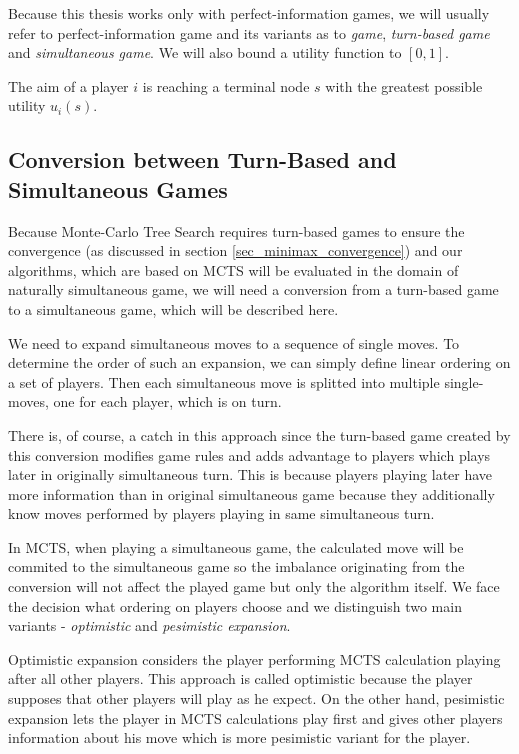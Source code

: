 Because this thesis works only with perfect-information games, we will usually refer to
perfect-information game and its variants as to \emph{game}, \emph{turn-based game} and
\emph{simultaneous game}. We will also bound a utility function to $[0,1]$.

The aim of a player $i$ is reaching a terminal node $s$ with the greatest possible utility
$u_i(s)$.

\subsection{Conversion between Turn-Based and Simultaneous Games}
\label{sec_turn_based_game_conversion}

Because Monte-Carlo Tree Search requires turn-based games to ensure the convergence (as discussed in
section \ref{sec_minimax_convergence}) and our
algorithms, which are based on MCTS will be evaluated in the domain of naturally simultaneous game,
we will need a conversion from a turn-based game to a simultaneous game, which will be described
here.

We need to expand simultaneous moves to a sequence of single moves. To determine the order of such
an expansion, we can simply define linear ordering on a set of players. Then each simultaneous move
is splitted into multiple single-moves, one for each player, which is on turn.

There is, of course, a catch in this approach since the turn-based game created by this conversion
modifies game rules and adds advantage to players which plays later in originally simultaneous turn.
This is because players playing later have more information than in original simultaneous game
because they additionally know moves performed by players playing in same simultaneous turn.

In MCTS, when playing a simultaneous game, the calculated move will be commited to the simultaneous
game so the imbalance originating from the conversion will not affect the played game but only the
algorithm itself. We face the decision what ordering on players choose and we distinguish two main
variants - \emph{optimistic} and \emph{pesimistic expansion}. 

Optimistic expansion considers the
player performing MCTS calculation playing after all other players. This approach is called
optimistic because the player supposes that other players will play as he expect. On the other hand,
pesimistic expansion lets the player in MCTS calculations play first and gives other players
information about his move which is more pesimistic variant for the player.

